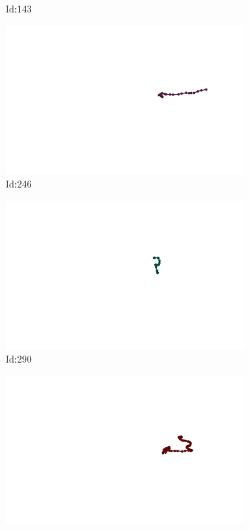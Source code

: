 \documentclass[12pt,twoside]{report}
\begin{document}
\begin{figure}
\begin{subfigure}[b]{0.20\textwidth}
\caption{Id:143}
\end{subfigure}
\begin{subfigure}[b]{0.20\textwidth}
\centering
\includegraphics[width=\textwidth]{../trajectories/246.png}
\caption{Id:246}
\end{subfigure}
\begin{subfigure}[b]{0.20\textwidth}
\centering
\includegraphics[width=\textwidth]{../trajectories/290.png}
\caption{Id:290}
\end{subfigure}
\begin{subfigure}[b]{0.20\textwidth}
\centering
\includegraphics[width=\textwidth]{../trajectories/292.png}

\end{subfigure}
\end{figure}
\end{document}

